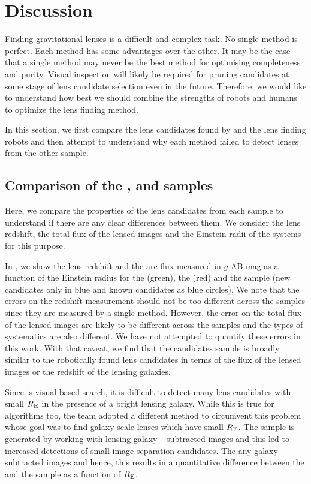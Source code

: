 \documentclass[useAMS,usenatbib,a4paper]{mn2e}
\begin{document}
\section{Discussion}
\label{sec:discuss}

Finding gravitational lenses is a difficult and complex task. No single
method is perfect. Each method has some advantages over the other. It
may be the case that a single method may never be the best method for
optimising completeness and purity. Visual inspection will likely be
required for pruning candidates at some stage of lens candidate
selection even in the future. Therefore, we would like to understand how
best we should combine the strengths of robots and humans to optimize
the lens finding method.

In this section, we first compare the lens candidates found by
\sw and the lens finding robots and then attempt to understand why each
method failed to detect lenses from the other sample.

\subsection{Comparison of the \rf, \sw and \af samples}
Here, we compare the properties of the lens candidates from each sample
to understand if there are any clear differences between them. We
consider the lens redshift, the total flux of the lensed images and the
Einstein radii of the systems for this purpose.

In , we show the lens redshift and the arc flux
measured in $g$ AB mag as a function of the Einstein radius for the \rf
(green), the \af (red) and the \sw sample (new candidates only in blue
and known candidates as blue circles). We note that the errors on the
redshift measurement should not be too different across the samples
since they are measured by a single method. However, the error on the
total flux of the lensed images are likely to be different across the
samples and the types of systematics are also different.  We have not
attempted to quantify these errors in this work. With that caveat, we
find that the \sw candidates sample is broadly similar to the
robotically found lens candidates in terms of the flux of the lensed
images or the redshift of the lensing galaxies.

Since \sw is visual based search, it is difficult to detect many lens
candidates with small $R_{\rm E}$ in the presence of a bright lensing
galaxy. While this is true for algorithms too, the \rf team adopted a
different method to circumvent this problem whose goal was to find
galaxy-scale lenses which have small $R_{\rm E}$. The \rf sample is
generated by working with lensing galaxy $-$subtracted images and this
led to increased detections of small image separation candidates. The
 any galaxy subtracted images and hence,
this results in a quantitative difference between the \sw and the \rf
sample as a function of $R_{\rm E}$.
\end{document}
